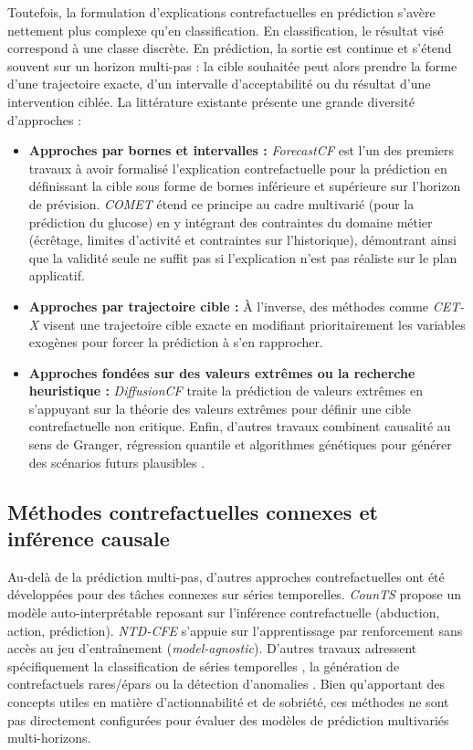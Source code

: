 Toutefois, la formulation d'explications contrefactuelles en prédiction s'avère nettement plus complexe qu'en classification. En classification, le résultat visé correspond à une classe discrète. En prédiction, la sortie est continue et s'étend souvent sur un horizon multi-pas : la cible souhaitée peut alors prendre la forme d'une trajectoire exacte, d'un intervalle d'acceptabilité ou du résultat d'une intervention ciblée. La littérature existante présente une grande diversité d'approches :
\begin{itemize}
    \item \textbf{Approches par bornes et intervalles :} \textit{ForecastCF} \cite{wang2023forecastcf} est l'un des premiers travaux à avoir formalisé l'explication contrefactuelle pour la prédiction en définissant la cible sous forme de bornes inférieure et supérieure sur l'horizon de prévision. \textit{COMET} \cite{wang2024comet} étend ce principe au cadre multivarié (pour la prédiction du glucose) en y intégrant des contraintes du domaine métier (écrêtage, limites d'activité et contraintes sur l'historique), démontrant ainsi que la validité seule ne suffit pas si l'explication n'est pas réaliste sur le plan applicatif.
    \item \textbf{Approches par trajectoire cible :} À l'inverse, des méthodes comme \textit{CET-X} \cite{kinjo2025cetx} visent une trajectoire cible exacte en modifiant prioritairement les variables exogènes pour forcer la prédiction à s'en rapprocher.
    \item \textbf{Approches fondées sur des valeurs extrêmes ou la recherche heuristique :} \textit{DiffusionCF} \cite{deng2024unraveling} traite la prédiction de valeurs extrêmes en s'appuyant sur la théorie des valeurs extrêmes pour définir une cible contrefactuelle non critique. Enfin, d'autres travaux combinent causalité au sens de Granger, régression quantile et algorithmes génétiques pour générer des scénarios futurs plausibles \cite{zuin2024navigating}.
\end{itemize}

\subsection{Méthodes contrefactuelles connexes et inférence causale}

Au-delà de la prédiction multi-pas, d'autres approches contrefactuelles ont été développées pour des tâches connexes sur séries temporelles. \textit{CounTS} \cite{yan2023self} propose un modèle auto-interprétable reposant sur l'inférence contrefactuelle (abduction, action, prédiction). \textit{NTD-CFE} \cite{sun2025no} s'appuie sur l'apprentissage par renforcement sans accès au jeu d'entraînement (\textit{model-agnostic}). D'autres travaux adressent spécifiquement la classification de séries temporelles \cite{delaney2021instance}, la génération de contrefactuels rares/épars \cite{lang2023sparse} ou la détection d'anomalies \cite{srinivasan2024ae}. Bien qu'apportant des concepts utiles en matière d'actionnabilité et de sobriété, ces méthodes ne sont pas directement configurées pour évaluer des modèles de prédiction multivariés multi-horizons.

